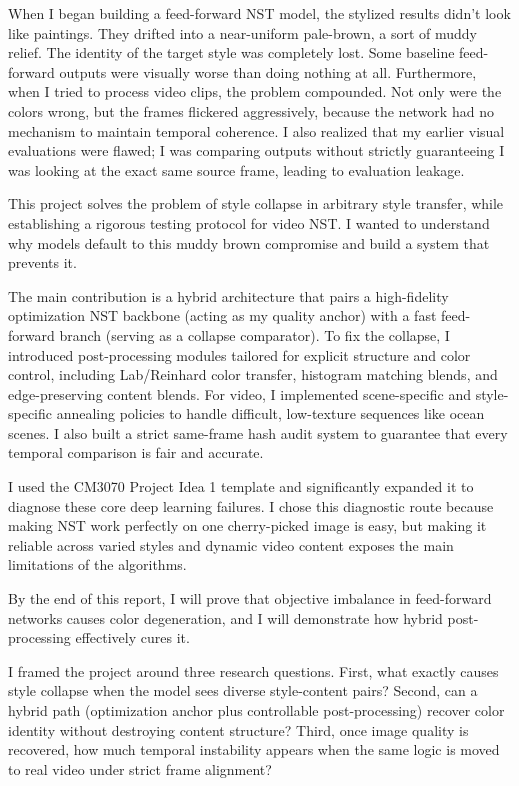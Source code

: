 \documentclass[12pt,letterpaper]{article}
\begin{document}
When I began building a feed-forward NST model, the stylized results didn't look like paintings. They drifted into a near-uniform pale-brown, a sort of muddy relief. The identity of the target style was completely lost. Some baseline feed-forward outputs were visually worse than doing nothing at all. Furthermore, when I tried to process video clips, the problem compounded. Not only were the colors wrong, but the frames flickered aggressively, because the network had no mechanism to maintain temporal coherence. I also realized that my earlier visual evaluations were flawed; I was comparing outputs without strictly guaranteeing I was looking at the exact same source frame, leading to evaluation leakage.

This project solves the problem of style collapse in arbitrary style transfer, while establishing a rigorous testing protocol for video NST. I wanted to understand why models default to this muddy brown compromise and build a system that prevents it.

The main contribution is a hybrid architecture that pairs a high-fidelity optimization NST backbone (acting as my quality anchor) with a fast feed-forward branch (serving as a collapse comparator). To fix the collapse, I introduced post-processing modules tailored for explicit structure and color control, including Lab/Reinhard color transfer, histogram matching blends, and edge-preserving content blends. For video, I implemented scene-specific and style-specific annealing policies to handle difficult, low-texture sequences like ocean scenes. I also built a strict same-frame hash audit system to guarantee that every temporal comparison is fair and accurate.

I used the CM3070 Project Idea 1 template and significantly expanded it to diagnose these core deep learning failures. I chose this diagnostic route because making NST work perfectly on one cherry-picked image is easy, but making it reliable across varied styles and dynamic video content exposes the main limitations of the algorithms.

By the end of this report, I will prove that objective imbalance in feed-forward networks causes color degeneration, and I will demonstrate how hybrid post-processing effectively cures it.

I framed the project around three research questions. First, what exactly causes style collapse when the model sees diverse style-content pairs? Second, can a hybrid path (optimization anchor plus controllable post-processing) recover color identity without destroying content structure? Third, once image quality is recovered, how much temporal instability appears when the same logic is moved to real video under strict frame alignment?
\end{document}
